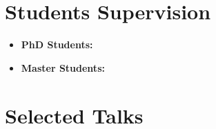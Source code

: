 \documentclass[10pt,letterpaper]{article}
\begin{document}
	\section*{Students Supervision}
	\vspace{-5pt}
	\begin{itemize}
		\item \textbf{PhD Students:} 
		\item \textbf{Master Students:} 
	\end{itemize}

	\section*{Selected Talks}
	
	
	
\end{document}
